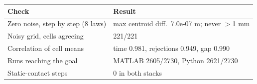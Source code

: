 \footnotesize
\setlength{\tabcolsep}{3pt}
\begin{tabular}{lp{}}
\toprule
Check & Result \\
\midrule
Zero noise, step by step (8 laws) & max centroid diff.\ 7.0e-07 m; never $>$1 mm \\
Noisy grid, cells agreeing & 221/221 \\
Correlation of cell means & time 0.981, rejections 0.949, gap 0.990 \\
Runs reaching the goal & MATLAB 2605/2730, Python 2621/2730 \\
Static-contact steps & 0 in both stacks \\
\bottomrule
\end{tabular}
